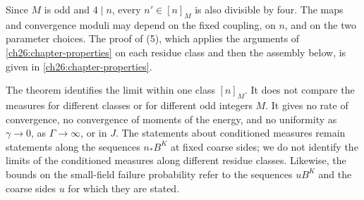 Since $M$ is odd and $4\mid n$, every $n'\in[n]_M$ is also divisible by four. The maps and convergence moduli may depend on the fixed coupling, on $n$, and on the two parameter choices. The proof of (5), which applies the arguments of \cref{ch26:chapter-properties} on each residue class and then the assembly below, is given in \cref{ch26:chapter-properties}.

\begin{remark}\label{ch26:rem:scope-full-sequence}
The theorem identifies the limit within one class $[n]_M$. It does not compare the measures for different classes or for different odd integers $M$. It gives no rate of convergence, no convergence of moments of the energy, and no uniformity as $\gamma\to0$, as $\Gamma\to\infty$, or in $J$. The statements about conditioned measures remain statements along the sequences $n_*B^K$ at fixed coarse sides; we do not identify the limits of the conditioned measures along different residue classes. Likewise, the bounds on the small-field failure probability refer to the sequences $uB^K$ and the coarse sides $u$ for which they are stated.
\end{remark}

